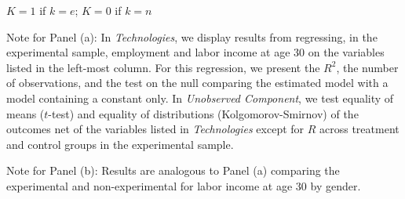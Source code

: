 \begin{table}[!htpb]
\begin{threeparttable}
\begin{tabular}{lcccc}
\end{tabular}
\begin{tablenotes}
\footnotesize
\item * $K = 1$ if $k = e$; $K = 0$ if $k = n$\\
\item Note for Panel (a): In \textit{Technologies}, we display results from regressing, in the experimental sample, employment and labor income at age 30 on the variables listed in the left-most column. For this regression, we present the $R^2$, the number of observations, and the test on the null comparing the estimated model with a model containing a constant only. In \textit{Unobserved Component}, we test equality of means ($t$-test) and equality of distributions (Kolgomorov-Smirnov) of the outcomes net of the variables listed in \textit{Technologies} except for $R$ across treatment and control groups in the experimental sample. \\
\item Note for Panel (b): Results are analogous to Panel (a) comparing the experimental and non-experimental for labor income at age 30 by gender.
\end{tablenotes}
\end{threeparttable}
\end{table}
\singlespace




